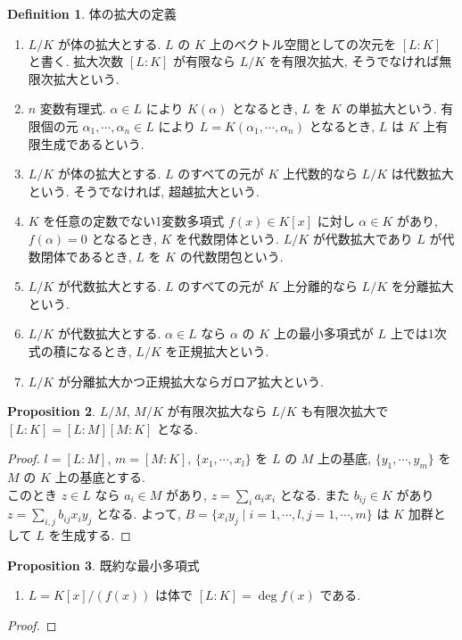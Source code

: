\documentclass[a4paper,dvipdfmx]{jsarticle}
\theoremstyle{plain}
\theoremstyle{definition}
\theoremstyle{plain}
\numberwithin{equation}{section}
\numberwithin{theorem}{section}
\numberwithin{definition}{section}
\numberwithin{note}{section}
\theoremstyle{definition}
\newtheorem{dfn}{Definition}[section]
\newtheorem{prop}[dfn]{Proposition}
\begin{document}
\begin{dfn}
  体の拡大の定義
  \begin{enumerate}
    \item $L/K$ が体の拡大とする. $L$ の $K$ 上のベクトル空間としての次元を $[L:K]$ と書く. 拡大次数 $[L:K]$ が有限なら $L/K$ を有限次拡大, そうでなければ無限次拡大という.
    \item $n$ 変数有理式. $\alpha\in L$ により $K(\alpha)$ となるとき, $L$ を $K$ の単拡大という. 有限個の元 $\alpha_1,\cdots,\alpha_n\in L$ により $L = K(\alpha_1,\cdots,\alpha_n)$ となるとき, $L$ は $K$ 上有限生成であるという.
    \item $L/K$ が体の拡大とする. $L$ のすべての元が $K$ 上代数的なら $L/K$ は代数拡大という. そうでなければ, 超越拡大という.
    \item $K$ を任意の定数でない1変数多項式 $f(x)\in K[x]$ に対し $\alpha\in K$ があり, $f(\alpha) = 0$ となるとき, $K$ を代数閉体という. $L/K$ が代数拡大であり $L$ が代数閉体であるとき, $L$ を $K$ の代数閉包という.
    \item $L/K$ が代数拡大とする. $L$ のすべての元が $K$ 上分離的なら $L/K$ を分離拡大という.
    \item $L/K$ が代数拡大とする. $\alpha\in L$ なら $\alpha$ の $K$ 上の最小多項式が $L$ 上では1次式の積になるとき, $L/K$ を正規拡大という.
    \item $L/K$ が分離拡大かつ正規拡大ならガロア拡大という.
  \end{enumerate}
\end{dfn}

\begin{prop}
  $L/M$, $M/K$ が有限次拡大なら $L/K$ も有限次拡大で $[L:K] = [L:M][M:K]$ となる.
\end{prop}
\begin{proof}
  $l = [L:M]$, $m = [M:K]$, $\lbrace x_1,\cdots,x_l \rbrace$ を $L$ の $M$ 上の基底, $\lbrace y_1,\cdots,y_m \rbrace$ を $M$ の $K$ 上の基底とする. \\
  このとき $z\in L$ なら $a_i\in M$ があり, $z = \sum_ia_ix_i$ となる. また $b_{ij}\in K$ があり $z = \sum_{i,j}b_{ij}x_iy_j$ となる. よって, $B=\lbrace x_iy_j\mid i=1,\cdots,l, j = 1,\cdots,m\rbrace$ は $K$ 加群として $L$ を生成する.
\end{proof}

\begin{prop}
  既約な最小多項式
  \begin{enumerate}
    \item $L = K[x]/(f(x))$ は体で $[L:K] = \deg f(x)$ である.
  \end{enumerate}
\end{prop}
\begin{proof}
\end{proof}
\end{document}
